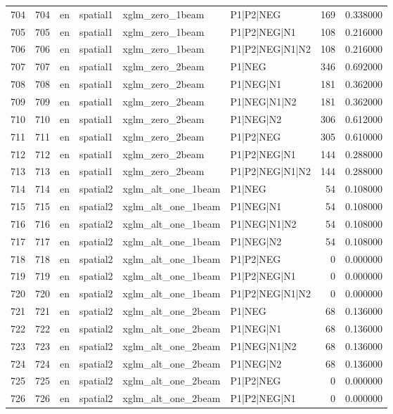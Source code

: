 \begin{tabular}{lrllllrr}
704 & 704 & en & spatial1 & xglm_zero_1beam & P1|P2|NEG & 169 & 0.338000 \\
705 & 705 & en & spatial1 & xglm_zero_1beam & P1|P2|NEG|N1 & 108 & 0.216000 \\
706 & 706 & en & spatial1 & xglm_zero_1beam & P1|P2|NEG|N1|N2 & 108 & 0.216000 \\
707 & 707 & en & spatial1 & xglm_zero_2beam & P1|NEG & 346 & 0.692000 \\
708 & 708 & en & spatial1 & xglm_zero_2beam & P1|NEG|N1 & 181 & 0.362000 \\
709 & 709 & en & spatial1 & xglm_zero_2beam & P1|NEG|N1|N2 & 181 & 0.362000 \\
710 & 710 & en & spatial1 & xglm_zero_2beam & P1|NEG|N2 & 306 & 0.612000 \\
711 & 711 & en & spatial1 & xglm_zero_2beam & P1|P2|NEG & 305 & 0.610000 \\
712 & 712 & en & spatial1 & xglm_zero_2beam & P1|P2|NEG|N1 & 144 & 0.288000 \\
713 & 713 & en & spatial1 & xglm_zero_2beam & P1|P2|NEG|N1|N2 & 144 & 0.288000 \\
714 & 714 & en & spatial2 & xglm_alt_one_1beam & P1|NEG & 54 & 0.108000 \\
715 & 715 & en & spatial2 & xglm_alt_one_1beam & P1|NEG|N1 & 54 & 0.108000 \\
716 & 716 & en & spatial2 & xglm_alt_one_1beam & P1|NEG|N1|N2 & 54 & 0.108000 \\
717 & 717 & en & spatial2 & xglm_alt_one_1beam & P1|NEG|N2 & 54 & 0.108000 \\
718 & 718 & en & spatial2 & xglm_alt_one_1beam & P1|P2|NEG & 0 & 0.000000 \\
719 & 719 & en & spatial2 & xglm_alt_one_1beam & P1|P2|NEG|N1 & 0 & 0.000000 \\
720 & 720 & en & spatial2 & xglm_alt_one_1beam & P1|P2|NEG|N1|N2 & 0 & 0.000000 \\
721 & 721 & en & spatial2 & xglm_alt_one_2beam & P1|NEG & 68 & 0.136000 \\
722 & 722 & en & spatial2 & xglm_alt_one_2beam & P1|NEG|N1 & 68 & 0.136000 \\
723 & 723 & en & spatial2 & xglm_alt_one_2beam & P1|NEG|N1|N2 & 68 & 0.136000 \\
724 & 724 & en & spatial2 & xglm_alt_one_2beam & P1|NEG|N2 & 68 & 0.136000 \\
725 & 725 & en & spatial2 & xglm_alt_one_2beam & P1|P2|NEG & 0 & 0.000000 \\
726 & 726 & en & spatial2 & xglm_alt_one_2beam & P1|P2|NEG|N1 & 0 & 0.000000 \\

\end{tabular}
